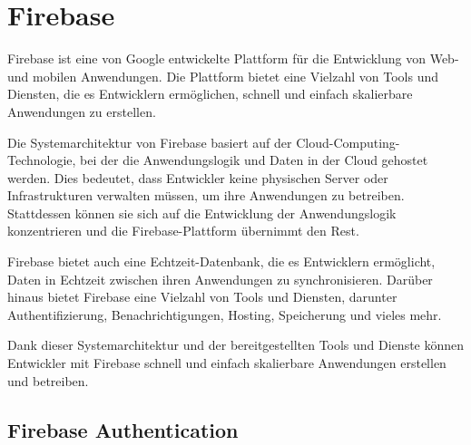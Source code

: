 



\section{Firebase}
Firebase\cite{firebase} ist eine von Google entwickelte Plattform für die Entwicklung von Web- und mobilen Anwendungen. Die Plattform bietet eine Vielzahl von Tools und Diensten, die es Entwicklern ermöglichen, schnell und einfach skalierbare Anwendungen zu erstellen.

Die Systemarchitektur von Firebase basiert auf der Cloud-Computing-Technologie, bei der die Anwendungslogik und Daten in der Cloud gehostet werden. Dies bedeutet, dass Entwickler keine physischen Server oder Infrastrukturen verwalten müssen, um ihre Anwendungen zu betreiben. Stattdessen können sie sich auf die Entwicklung der Anwendungslogik konzentrieren und die Firebase-Plattform übernimmt den Rest.

Firebase bietet auch eine Echtzeit-Datenbank, die es Entwicklern ermöglicht, Daten in Echtzeit zwischen ihren Anwendungen zu synchronisieren. Darüber hinaus bietet Firebase eine Vielzahl von Tools und Diensten, darunter Authentifizierung, Benachrichtigungen, Hosting, Speicherung und vieles mehr.

Dank dieser Systemarchitektur und der bereitgestellten Tools und Dienste können Entwickler mit Firebase schnell und einfach skalierbare Anwendungen erstellen und betreiben.

\subsection{Firebase Authentication}
\author{Sandin Habibovic}

